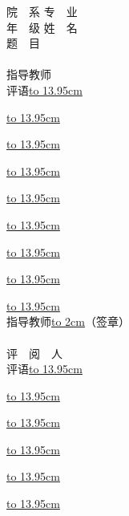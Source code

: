 
\hspace{-0.85cm}院\ \ 系\underline{}
专\ \ 业\underline{}
\\年\ \ 级\underline{}
姓\ \ 名\underline{}
\\题\ \ 目\underline{}
\\
\\
指导教师
\\评\quad\quad 语\uline{\hbox to 13.95cm{}}

\hspace{0.85cm}\underline{\hbox to 13.95cm{}}

\hspace{0.85cm}\underline{\hbox to 13.95cm{}}

\hspace{0.85cm}\underline{\hbox to 13.95cm{}}

\hspace{0.85cm}\underline{\hbox to 13.95cm{}}

\hspace{0.85cm}\underline{\hbox to 13.95cm{}}

\hspace{0.85cm}\underline{\hbox to 13.95cm{}}

\hspace{0.85cm}\underline{\hbox to 13.95cm{}}

\hspace{0.85cm}\underline{\hbox to 13.95cm{}}
\\

\hspace{9.8cm}指导教师\underline{\hbox to 2cm{}}（签章）
\\
\\
评\ \ 阅\ \ 人
\\评\quad\quad 语\underline{\hbox to 13.95cm{}}

\hspace{0.85cm}\underline{\hbox to 13.95cm{}}

\hspace{0.85cm}\underline{\hbox to 13.95cm{}}

\hspace{0.85cm}\underline{\hbox to 13.95cm{}}

\hspace{0.85cm}\underline{\hbox to 13.95cm{}}

\hspace{0.85cm}\underline{\hbox to 13.95cm{}}

